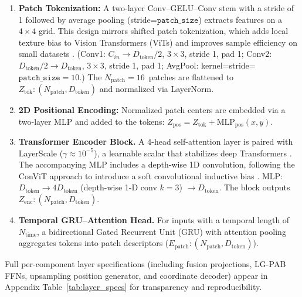 \documentclass[remotesensing,article,accept,pdftex,moreauthors]{Definitions/mdpi}
\begin{document}
\begin{enumerate}[leftmargin=*]
\item \textbf{Patch Tokenization:}
      A two-layer Conv–GELU–Conv stem with a stride of 1
      followed by average pooling (stride=$\texttt{patch\_size}$) extracts features on a $4\times4$ grid. This design mirrors shifted patch tokenization, which adds local texture bias to Vision Transformers (ViTs) and improves sample efficiency on small datasets \cite{lee2021vision}.
 (Conv1: $C_{in}\rightarrow D_{\text{token}}/2$, $3\times3$, stride 1, pad 1; Conv2: $D_{\text{token}}/2\rightarrow D_{\text{token}}$, $3\times3$, stride 1, pad 1; AvgPool: kernel=stride=$\texttt{patch\_size}=10$.) The \mbox{$N_{\text{patch}}=16$ patches} are flattened to $Z_{\text{tok}}: (N_{\text{patch}}, D_{\text{token}})$ and normalized via LayerNorm.


\item \textbf{2D Positional Encoding:}
      Normalized patch centers are embedded via a two-layer MLP and added to the tokens: $Z_{\text{pos}} = Z_{\text{tok}} + \text{MLP}_{\text{pos}}(x,y)$.

\item \textbf{Transformer Encoder Block.}
      A 4-head self-attention layer is paired with LayerScale ($\gamma \approx 10^{-5}$), a learnable scalar that stabilizes deep Transformers \cite{touvron2021going}. The accompanying MLP includes a depth-wise 1D convolution, following the ConViT approach to introduce a soft convolutional inductive bias \cite{dascoli2021convit}. MLP: $D_{\text{token}} \rightarrow 4 D_{\text{token}}$ (depth-wise 1-D conv $k=3$) $\rightarrow D_{\text{token}}$. The block outputs $Z_{\text{enc}}: (N_{\text{patch}}, D_{\text{token}})$.



\item \textbf{Temporal GRU–Attention Head.}
      For inputs with a temporal length of $N_{\text{time}}$, a bidirectional Gated Recurrent Unit (GRU) with attention pooling aggregates tokens into patch descriptors ($E_{\text{patch}}: (N_{\text{patch}}, D_{\text{token}})$).
\end{enumerate}

Full per-component layer specifications (including fusion projections, LG-PAB FFNs, upsampling position generator, and coordinate decoder) appear in Appendix Table~\ref{tab:layer_specs} for transparency and reproducibility.

\vspace{-9pt}
\end{document}
